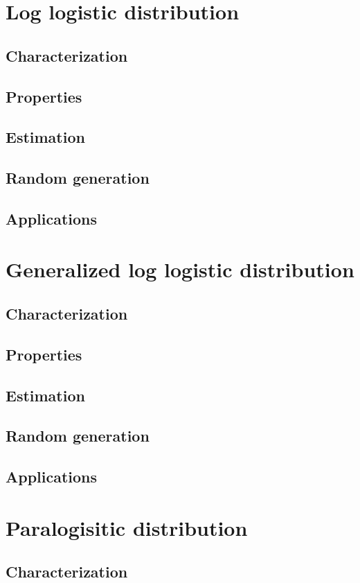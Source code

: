 \section{Log logistic distribution}
\subsection{Characterization}
\subsection{Properties}
\subsection{Estimation}
\subsection{Random generation}
\subsection{Applications}

\section{Generalized log logistic  distribution}
\subsection{Characterization}
\subsection{Properties}
\subsection{Estimation}
\subsection{Random generation}
\subsection{Applications}

\section{Paralogisitic distribution}
\subsection{Characterization}
